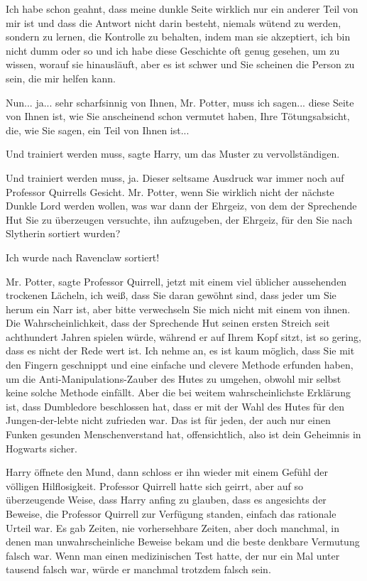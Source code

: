 \glqq{}Ich habe schon geahnt, dass meine dunkle Seite wirklich nur ein anderer
Teil von mir ist und dass die Antwort nicht darin besteht, niemals wütend zu
werden, sondern zu lernen, die Kontrolle zu behalten, indem man sie akzeptiert,
ich bin nicht dumm oder so und ich habe diese Geschichte oft genug gesehen, um
zu wissen, worauf sie hinausläuft, aber es ist schwer und Sie scheinen die
Person zu sein, die mir helfen kann.\grqq{}

\glqq{}Nun... ja... sehr scharfsinnig von Ihnen, Mr. Potter, muss ich sagen...
diese Seite von Ihnen ist, wie Sie anscheinend schon vermutet haben, Ihre
Tötungsabsicht, die, wie Sie sagen, ein Teil von Ihnen ist...\grqq{}

\glqq{}Und trainiert werden muss\grqq{}, sagte Harry, um das Muster zu
vervollständigen.

\glqq{}Und trainiert werden muss, ja.\grqq{} Dieser seltsame Ausdruck war immer
noch auf Professor Quirrells Gesicht. \glqq{}Mr. Potter, wenn Sie wirklich nicht
der nächste Dunkle Lord werden wollen, was war dann der Ehrgeiz, von dem der
Sprechende Hut Sie zu überzeugen versuchte, ihn aufzugeben, der Ehrgeiz, für den
Sie nach Slytherin sortiert wurden?\grqq{}

\glqq{}Ich wurde nach Ravenclaw sortiert!\grqq{}

\glqq{}Mr. Potter\grqq{}, sagte Professor Quirrell, jetzt mit einem viel üblicher
aussehenden trockenen Lächeln, \glqq{}ich weiß, dass Sie daran gewöhnt sind, dass
jeder um Sie herum ein Narr ist, aber bitte verwechseln Sie mich nicht mit einem
von ihnen. Die Wahrscheinlichkeit, dass der Sprechende Hut seinen ersten Streich
seit achthundert Jahren spielen würde, während er auf Ihrem Kopf sitzt, ist so
gering, dass es nicht der Rede wert ist. Ich nehme an, es ist kaum möglich, dass
Sie mit den Fingern geschnippt und eine einfache und clevere Methode erfunden
haben, um die Anti-Manipulations-Zauber des Hutes zu umgehen, obwohl mir selbst
keine solche Methode einfällt. Aber die bei weitem wahrscheinlichste Erklärung
ist, dass Dumbledore beschlossen hat, dass er mit der Wahl des Hutes für den
Jungen-der-lebte nicht zufrieden war. Das ist für jeden, der auch nur einen
Funken gesunden Menschenverstand hat, offensichtlich, also ist dein Geheimnis in
Hogwarts sicher.\grqq{}

Harry öffnete den Mund, dann schloss er ihn wieder mit einem Gefühl der völligen
Hilflosigkeit. Professor Quirrell hatte sich geirrt, aber auf so überzeugende
Weise, dass Harry anfing zu glauben, dass es angesichts der Beweise, die
Professor Quirrell zur Verfügung standen, einfach das rationale Urteil war. Es
gab Zeiten, nie vorhersehbare Zeiten, aber doch manchmal, in denen man
unwahrscheinliche Beweise bekam und die beste denkbare Vermutung falsch war.
Wenn man einen medizinischen Test hatte, der nur ein Mal unter tausend falsch
war, würde er manchmal trotzdem falsch sein.

